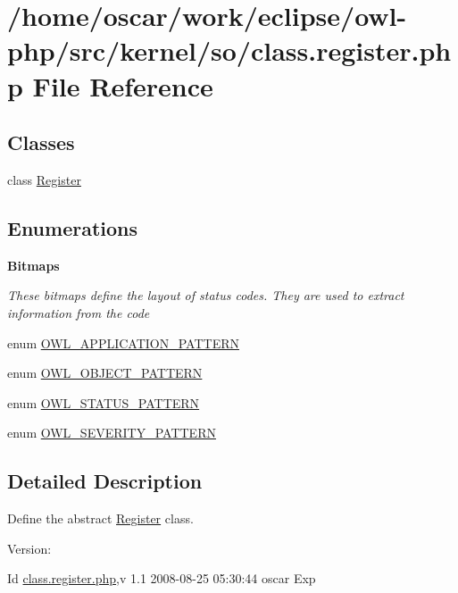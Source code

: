 \hypertarget{class_8register_8php}{
\section{/home/oscar/work/eclipse/owl-php/src/kernel/so/class.register.php File Reference}
\label{class_8register_8php}
}
\subsection*{Classes}
\begin{CompactItemize}
\item 
class \hyperlink{classRegister}{Register}
\end{CompactItemize}
\subsection*{Enumerations}
\begin{Indent}{\bf Bitmaps}\par
{\em These bitmaps define the layout of status codes. They are used to extract information from the code }\begin{CompactItemize}
\item 
enum \hyperlink{class_8register_8php_22359c406b8745e8fa2412ec96d5e74c}{OWL\_\-APPLICATION\_\-PATTERN} 
\item 
enum \hyperlink{class_8register_8php_ac5ed52fb1bbffdff69e9a24c40962f5}{OWL\_\-OBJECT\_\-PATTERN} 
\item 
enum \hyperlink{class_8register_8php_0a8649e9ad7fa654df2c41aa4ba1283c}{OWL\_\-STATUS\_\-PATTERN} 
\item 
enum \hyperlink{class_8register_8php_eb9363fcaa1cd911762ff88518a9d973}{OWL\_\-SEVERITY\_\-PATTERN} 
\end{CompactItemize}
\end{Indent}


\subsection{Detailed Description}
Define the abstract \hyperlink{classRegister}{Register} class. \begin{Desc}
\item[Version:]\end{Desc}
\begin{Desc}
\item[Id]\hyperlink{class_8register_8php}{class.register.php},v 1.1 2008-08-25 05:30:44 oscar Exp \end{Desc}



